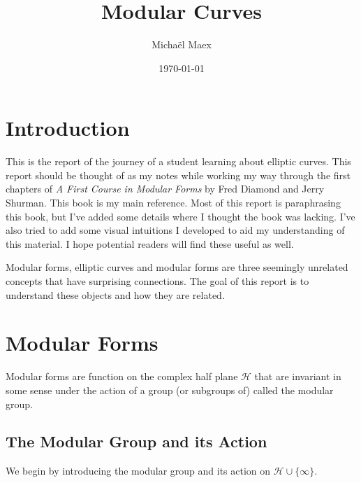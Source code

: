 \documentclass[a4paper]{article}
\author{Micha\"el Maex}
\date{\today}
\title{Modular Curves}
\theoremstyle{theoremdd}
\theoremstyle{definitiondd}
\theoremstyle{remarkdd}
\begin{document}
\maketitle

\bigskip

\tableofcontents

\pagebreak

\section{Introduction}

This is the report of the journey of a student learning about elliptic curves. 
This report should be thought of as my notes while working my way through the first chapters of \emph{A First Course in Modular Forms} by Fred Diamond and Jerry Shurman. 
This book is my main reference. 
Most of this report is paraphrasing this book, but I've added some details where I thought the book was lacking. 
I've also tried to add some visual intuitions I developed to aid my understanding of this material. I hope potential readers will find these useful as well. 

Modular forms, elliptic curves and modular forms are three seemingly unrelated concepts that have surprising connections. 
The goal of this report is to understand these objects and how they are related. 

\section{Modular Forms}
Modular forms are function on the complex half plane $\mathcal{H} $ that are invariant in some sense under the action of a group (or subgroups of) called the modular group.

\subsection{The Modular Group and its Action}
We begin by introducing the modular group and its action on $\mathcal{H} \cup \{\infty\} $.  
\end{document}

